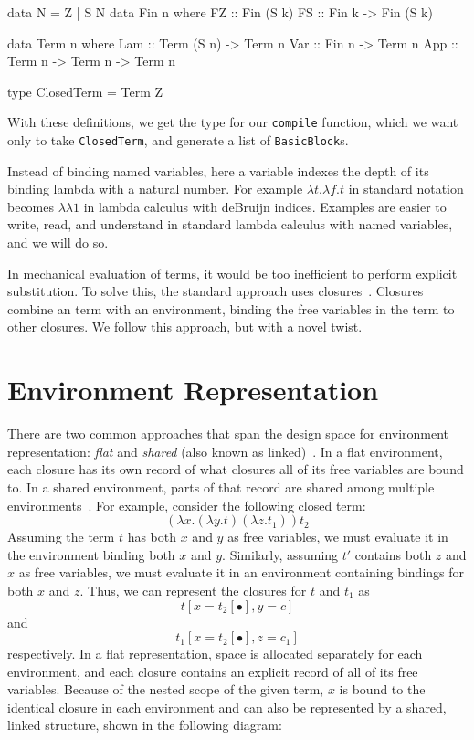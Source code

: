 \documentclass[preprint]{sigplanconf}
\begin{document}
\begin{code}
data N = Z | S N
data Fin n where
  FZ :: Fin (S k)
  FS :: Fin k -> Fin (S k)

data Term n where
  Lam :: Term (S n) -> Term n
  Var :: Fin n -> Term n 
  App :: Term n -> Term n -> Term n

type ClosedTerm = Term Z
\end{code}

With these definitions, we get the type for our \texttt{compile} function, which
we want only to take \texttt{ClosedTerm}, and generate a list of
\texttt{BasicBlock}s.

Instead of binding named variables, here a variable indexes the depth of its
binding lambda with a natural number. For example $\lambda t.\lambda f.t$ in
standard notation becomes $\lambda\lambda1$ in lambda calculus with deBruijn
indices.  Examples are easier to write, read, and understand in standard lambda
calculus with named variables, and we will do so.

In mechanical evaluation of terms, it would be too inefficient to perform
explicit substitution. To solve this, the standard approach uses
closures~\cite{landin1964mechanical, curien1991abstract, jonesstg,
biernacka2007concrete}. Closures combine an term with an environment, binding
the free variables in the term to other closures. We follow this
approach, but with a novel twist. 

\section{Environment Representation} \label{sec:env}

There are two common approaches that span the design space for environment
representation: \emph{flat} and \emph{shared} (also
known as linked)~\cite{appel1988optimizing, shao1994space}. In a flat
environment, each closure has its own record of what closures all
of its free variables are bound to. In a shared environment, parts
of that record are shared among multiple environments~\cite{appel1988optimizing,
shao1994space}. For example, consider the following closed term: $$(\lambda
x.(\lambda y.t) (\lambda z.t_1)) t_2$$ Assuming the term $t$ has both $x$ and
$y$ as free variables, we must evaluate it in the environment binding both $x$
and $y$.  Similarly, assuming $t'$ contains both $z$ and $x$ as free variables,
we must evaluate it in an environment containing bindings for both $x$ and $z$.
Thus, we can represent the closures for $t$ and $t_1$ as $$t[x=t_2[\bullet],
y=c]$$ and $$t_1[x=t_2[\bullet], z=c_1]$$ respectively. In a flat
representation, space is allocated separately for each environment, and each
closure contains an explicit record of all of its free variables. Because of the
nested scope of the given term, $x$ is bound to the identical closure in each
environment and can also be represented by a shared, linked structure, shown in
the following diagram:
\end{document}
